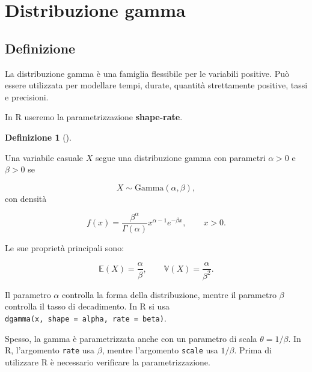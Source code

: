 \documentclass[
  italian,
  letterpaper,
  a4paper,
  11pt,
  open=any]{scrbook}
\theoremstyle{plain}
\theoremstyle{definition}
\theoremstyle{definition}
\newtheorem{definition}{Definizione}[chapter]
\theoremstyle{remark}
\begin{document}
\section{Distribuzione gamma}\label{sec-cont-gamma}

\subsection{Definizione}\label{definizione-7}

La distribuzione gamma è una famiglia flessibile per le variabili
positive. Può essere utilizzata per modellare tempi, durate, quantità
strettamente positive, tassi e precisioni.

In R useremo la parametrizzazione \textbf{shape-rate}.

\begin{definition}[]\protect\hypertarget{def-gamma}{}\label{def-gamma}

Una variabile casuale \(X\) segue una distribuzione gamma con parametri
\(\alpha > 0\) e \(\beta > 0\) se

\[
X \sim \mathrm{Gamma}(\alpha,\beta),
\] con densità

\[
f(x) = \frac{\beta^\alpha}{\Gamma(\alpha)} x^{\alpha-1} e^{-\beta x},
\qquad x > 0.
\]

Le sue proprietà principali sono:

\[
\mathbb{E}(X)=\frac{\alpha}{\beta},
\qquad
\mathbb{V}(X)=\frac{\alpha}{\beta^2}.
\]

\end{definition}

Il parametro \(\alpha\) controlla la forma della distribuzione, mentre
il parametro \(\beta\) controlla il tasso di decadimento. In R si usa
\texttt{dgamma(x,\ shape\ =\ alpha,\ rate\ =\ beta)}.

\begin{tcolorbox}[enhanced jigsaw, arc=.35mm, bottomrule=.15mm, bottomtitle=1mm, breakable, colback=white, colbacktitle=quarto-callout-warning-color!10!white, colframe=quarto-callout-warning-color-frame, coltitle=black, left=2mm, leftrule=.75mm, opacityback=0, opacitybacktitle=0.6, rightrule=.15mm, title=\textcolor{quarto-callout-warning-color}{\faExclamationTriangle}\hspace{0.5em}{Rate e scale}, titlerule=0mm, toprule=.15mm, toptitle=1mm]

Spesso, la gamma è parametrizzata anche con un parametro di scala
\(\theta = 1/\beta\). In R, l'argomento \texttt{rate} usa \(\beta\),
mentre l'argomento \texttt{scale} usa \(1/\beta\). Prima di utilizzare R
è necessario verificare la parametrizzazione.

\end{tcolorbox}
\end{document}
